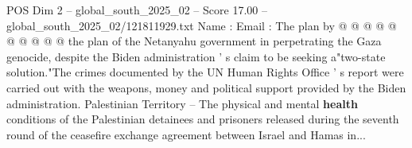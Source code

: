 \begin{textsample}{POS Dim 2 – global\_south\_2025\_02 – Score 17.00 – global\_south\_2025\_02/121811929.txt}
Name : Email : The plan by @ @ @ @ @ @ @ @ @ @ the plan of the Netanyahu government in perpetrating the Gaza genocide, despite the Biden administration ' s claim to be seeking a"two-state solution."The crimes documented by the UN Human Rights Office ' s report were carried out with the weapons, money and political support provided by the Biden administration.
Palestinian Territory -- The physical and mental \textbf{health} conditions of the Palestinian detainees and prisoners released during the seventh round of the ceasefire exchange agreement between Israel and Hamas in...

\end{textsample}
